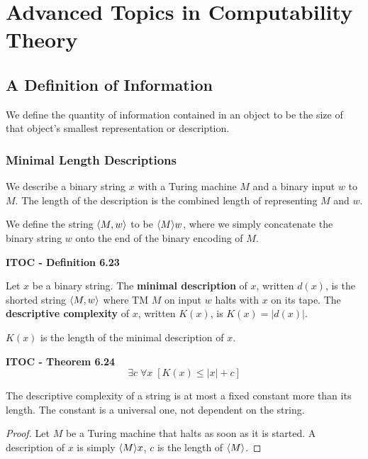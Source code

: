 \section{Advanced Topics in Computability Theory}

\subsection{A Definition of Information}

We define the quantity of information contained in an object to be the size of that object's smallest representation or description.

\subsubsection{Minimal Length Descriptions}

We describe a binary string $x$ with a Turing machine $M$ and a binary input $w$ to $M$. The length of the description is the combined  length of representing $M$ and $w$. 

We define the string $\langle{M, w}\rangle$ to be $\langle{M}\rangle w$, where we simply concatenate the binary string $w$ onto the end of the binary encoding of $M$.

\begin{shaded}
\textbf{ITOC - Definition 6.23}

\medskip
Let $x$ be a binary string. The \textbf{minimal description} of $x$, written $d(x)$, is the shorted string $\langle{M, w}\rangle$ where TM $M$ on input $w$ halts with $x$ on its tape. The \textbf{descriptive complexity} of $x$, written $K(x)$, is $K(x) = |d(x)|$.
\end{shaded}

{\color{blue} $K(x)$ is the length of the minimal description of $x$}.


\begin{shaded}
\textbf{ITOC - Theorem 6.24}
\[
\exists c \; \forall x \;  [K(x) \leq |x| + c]
\]
\end{shaded}

The descriptive complexity of a string is at most a fixed constant more than its length. The constant is a universal one, not dependent on the string.

\begin{mdframed}
\begin{proof}
Let $M$ be a Turing machine that halts as soon as it is started. A description of $x$ is simply $\langle{M}\rangle x$, $c$ is the length of $\langle{M}\rangle$.
\end{proof}
\end{mdframed}

